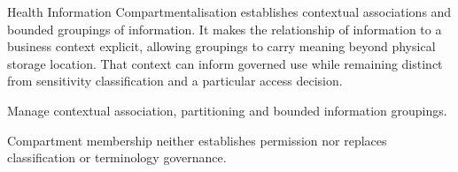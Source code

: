 Health Information Compartmentalisation establishes contextual associations and bounded groupings of information. It makes the relationship of information to a business context explicit, allowing groupings to carry meaning beyond physical storage location. That context can inform governed use while remaining distinct from sensitivity classification and a particular access decision.



Manage contextual association, partitioning and bounded information groupings.



Compartment membership neither establishes permission nor replaces classification or terminology governance.


